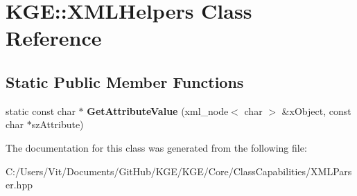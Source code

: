 \hypertarget{class_k_g_e_1_1_x_m_l_helpers}{\section{K\-G\-E\-:\-:X\-M\-L\-Helpers Class Reference}
\label{class_k_g_e_1_1_x_m_l_helpers}
}
\subsection*{Static Public Member Functions}
\begin{DoxyCompactItemize}
\item 
\hypertarget{class_k_g_e_1_1_x_m_l_helpers_a995e42ae1d73fdd7b811fae44b1da23d}{static const char $\ast$ {\bfseries Get\-Attribute\-Value} (xml\-\_\-node$<$ char $>$ \&x\-Object, const char $\ast$sz\-Attribute)}\label{class_k_g_e_1_1_x_m_l_helpers_a995e42ae1d73fdd7b811fae44b1da23d}

\end{DoxyCompactItemize}


The documentation for this class was generated from the following file\-:\begin{DoxyCompactItemize}
\item 
C\-:/\-Users/\-Vit/\-Documents/\-Git\-Hub/\-K\-G\-E/\-K\-G\-E/\-Core/\-Class\-Capabilities/X\-M\-L\-Parser.\-hpp\end{DoxyCompactItemize}

